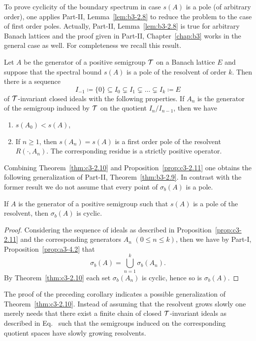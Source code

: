 To prove cyclicity of the boundary spectrum in case $s(A)$ is a pole (of arbitrary order), one applies Part-II, Lemma~\ref{lem:b3-2.8} to reduce the problem to the case of first order poles. 
Actually, Part-II, Lemma~\ref{lem:b3-2.8} is true for arbitrary Banach lattices and the proof given in Part-II, Chapter~\ref{chap:b3} works in the general case as well. 
For completeness we recall this result. 
\begin{proposition}\label{prop:c3-2.11}
	Let $A$ be the generator of a positive semigroup $\mathcal{T}$ on a Banach lattice $E$ and suppose that the spectral bound $s(A)$ is a pole of the resolvent%
    of order $k$.
	Then there is a sequence
	\begin{equation}\label{eq:c3-2.22}
		I_{-1} \coloneq \{0\} \subseteq I_{0} \subsetneq I_{1} \subsetneq \dots \subsetneq I_{k} \coloneq E
	\end{equation}
	of\/ $\mathcal{T}$-invariant closed ideals with the following properties.
	If\/ $A_{n}$ is the generator of the semigroup induced by $\mathcal{T}$ on the quotient $I_{n}/I_{n-1}$, then we have
	\begin{enumerate}[\upshape (i)]
		\item 	
		$s(A_{0}) < s(A)$, 

		\item 
		If\/ $n \geq 1$, then $s(A_{n}) = s(A)$ is a first order pole of the resolvent $R(\cdot,A_{n})$.
		The corresponding residue is a strictly positive operator.

	\end{enumerate}
\end{proposition}
Combining Theorem~\ref{thm:c3-2.10} and Proposition~\ref{prop:c3-2.11} one obtains the following generalization of Part-II, Theorem~\ref{thm:b3-2.9}.
In contrast with the former result we do not assume that every point of\/ $\sigma_{b}(A)$ is a pole.
\begin{corollary}\label{cor:c3-2.12}
	If\/ $A$ is the generator of a positive semigroup such that $s(A)$ is a pole of the resolvent, then $\sigma_{b}(A)$ is cyclic.
\end{corollary}
\begin{proof}
Considering the sequence of ideals as described in Proposition~\ref{prop:c3-2.11} and the corresponding generators $A_{n}$ $(0 \leq n \leq k)$, then we have by Part-I, Proposition~\ref{prop:a3-4.2} that 
%
\[
	\sigma_{b}(A) = \bigcup_{n=1}^{k} \sigma_{b}(A_{n}) .
\]
%
By Theorem~\ref{thm:c3-2.10} each set $\sigma_{b}(A_{n})$ is cyclic, hence so is $\sigma_{b}(A)$.
\end{proof}
The proof of the preceding corollary indicates a possible generalization of Theorem~\ref{thm:c3-2.10}.
Instead of assuming that the resolvent grows slowly one merely needs that there exist a finite chain of closed $\mathcal{T}$-invariant ideals as described in Eq.~ such that the semigroups induced on the corresponding quotient spaces have slowly growing resolvents.

